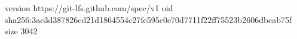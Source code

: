 version https://git-lfs.github.com/spec/v1
oid sha256:3ac3d387826cd21d1864554c27fe595c0e70d7711f22ff75523b2606dbcab75f
size 3042
